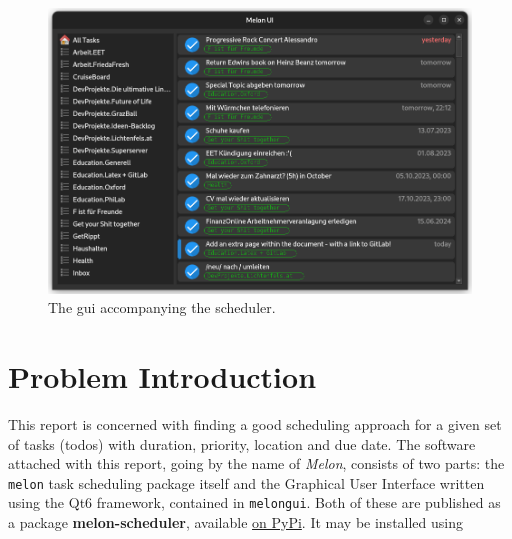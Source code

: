\documentclass{prettytex/ox/mmsc-special-topic}
\title{\topictitle}
\author{Candidate \candidatenumber}
\date{\today}
\begin{document}
  \pagestyle{plain}
  \mmscSpecialHeader

  \begin{abstract}
    \label{abstract}
    \vspace*{0.2cm}


    The algorithm is implemented four times, twice in Python, once in Rust and also in C++.
    Python module bindings to these low-level language implementations are provided using \texttt{rust-cpython} and \texttt{pybind11}, respectively.
  \end{abstract}

  \begin{figure}[H]
    \centering
    \includegraphics[width=0.85\linewidth]{figures/melon-ui.png}
    \caption{The \gls{gui} accompanying the scheduler.}
    \label{fig:gui}
  \end{figure}

  \pagebreak
  \pagestyle{normal}


  \section{Problem Introduction}
  \label{sec:introduction}

  This report is concerned with finding a good scheduling approach for a given set of tasks (todos) with duration, priority, location and due date.
  The software attached with this report, going by the name of \textit{Melon}, consists of two parts: the \texttt{melon} task scheduling package itself and the Graphical User Interface written using the Qt6 framework, contained in \texttt{melongui}.
  Both of these are published as a package \textbf{melon-scheduler}, available \href{https://pypi.org/project/melon-scheduler/}{on PyPi}. It may be installed using
\end{document}
